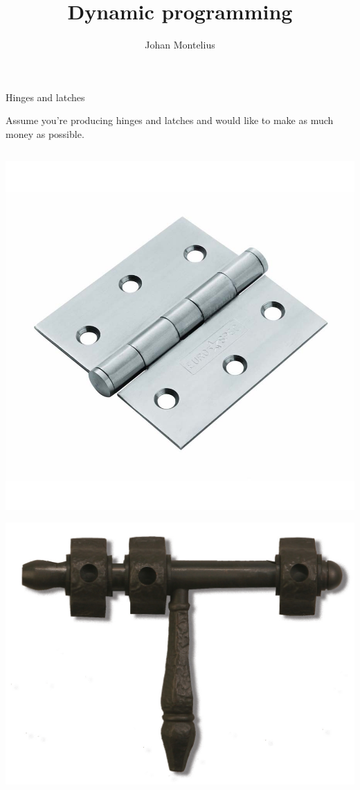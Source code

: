 

\title[ID1019 Dynamic programming]{Dynamic programming}
 

\author{Johan Montelius}
\date{\semester}



\begin{frame}
\titlepage
\end{frame}

\begin{frame}{Hinges and latches}

\pause Assume you're producing hinges and latches and would like to make as much money as possible.

\begin{columns}

 \begin{column}{0.4\linewidth}

\includegraphics[width=0.8\linewidth]{hinges.jpg}

\includegraphics[width=0.8\linewidth]{latch.jpg}


\end{column}
\end{columns}
\end{frame}
